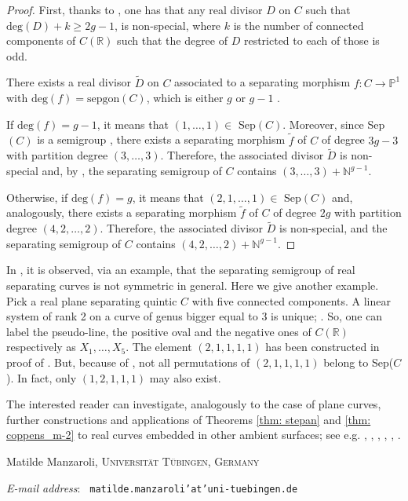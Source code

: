 \begin{proof}
First, thanks to \cite[Theorem 2.5]{Huis03}, one has that any real divisor $D$ on $C$ such that $\text{deg}(D)+k \geq 2g-1$, is non-special, where $k$ is the number of connected components of $C(\mathbb R)$ such that the degree of $D$ restricted to each of those is odd.

There exists a real divisor $\tilde D$ on $C$ associated to a separating morphism $f: C \rightarrow \mathbb P^1$ with $\text{deg}(f)=\text{sepgon}(C)$, which is either $g$ or $g-1$ \cite[Theorem 7.1]{Gaba06}.

If $\text{deg}(f)=g-1$, it means that $(1,\dots, 1) \in$ Sep$(C)$. Moreover, since Sep$(C)$ is a semigroup \cite[Proposition 2.1]{KumShaw20}, there exists a separating morphism $\tilde f$ of $C$ of degree $3g-3$ with partition degree $(3, \dots, 3)$. Therefore, the associated divisor $\tilde D$ is non-special and, by \cite[Proposition 3.2 and Remark 3.3]{KumShaw20}, the separating semigroup of $C$ contains $(3, \dots, 3) + \mathbb N^{g-1}$.

Otherwise, if $\text{deg}(f)=g$, it means that $(2,1,\dots, 1) \in$ Sep$(C)$ and, analogously, there exists a separating morphism $\tilde f$ of $C$ of degree $2g$ with partition degree $(4,2, \dots, 2)$. Therefore, the associated divisor $\tilde D$ is non-special, and the separating semigroup of $C$ contains $(4, 2, \dots, 2) + \mathbb N^{g-1}$.

\end{proof}
\begin{rem}
In \cite[Example 2.8]{KumShaw20}, it is observed, via an example, that the separating semigroup of real separating curves is not symmetric in general. Here we give another example. Pick a real plane separating quintic $C$ with five connected components. A linear system of rank 2 on a curve of genus bigger equal to 3 is unique; \cite[A.18]{ACGH85}. So, one can label the pseudo-line, the positive oval and the negative ones of $C(\mathbb R)$ respectively as $X_1,\dots,X_5$. The element $(2,1,1,1,1)$ has been constructed in proof of . But, because of , not all permutations of $(2,1,1,1,1)$ belong to Sep($C$). In fact, only $(1,2,1,1,1)$ may also exist.	
	\end{rem}

\begin{rem}
	\label{rem: other_surfaces}
	The interested reader can investigate, analogously to the case of plane curves, further constructions and applications of Theorems \ref{thm: stepan} and \ref{thm: coppens_m-2} to real curves embedded in other ambient surfaces; see e.g. \cite{DegKha00}, \cite{GudShu80}, \cite{Mikh98}, \cite{Manz21}, \cite{Manz22}, \cite{Orev03}.
\end{rem}



\par\nopagebreak
Matilde Manzaroli, \textsc{Universit\"{a}t T\"{u}bingen, Germany}\par\nopagebreak
 \textit{E-mail address}: \texttt{ matilde.manzaroli'at'uni-tuebingen.de}

